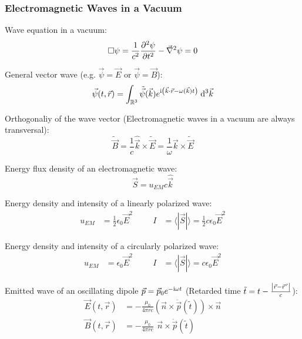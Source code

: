 		\subsubsection{Electromagnetic Waves in a Vacuum}
			\noindent
			Wave equation in a vacuum:
			\begin{equation}
				\Box\psi = \frac{1}{c^2} \frac{\partial^2 \psi}{\partial t^2} - \vec{\nabla}^2 \psi = 0
			\end{equation}

			\noindent
			General vector wave (e.g. $\vec{\psi}=\vec{E}$ or $ \vec{\psi}=\vec{B}$):
			\begin{equation}
				\vec{\psi}(t,\vec{r}) = \int_{\mathbb{R}^3} \tilde{\vec{\psi}} (\vec{k}) e^{\mathrm{i}\left(\vec{k}\cdot\vec{r} - \omega(\vec{k})t \right)}\; \mathrm{d}^3\vec{k}
			\end{equation}

			\noindent
			Orthogonaliy of the wave vector (Electromagnetic waves in a vacuum are always transversal):
			\begin{equation}
				\tilde{\vec{B}} = \frac{1}{c}\hat{\vec{k}}\times\tilde{\vec{E}} = \frac{1}{\omega}\vec{k}\times\tilde{\vec{E}}
			\end{equation}

			\noindent
			Energy flux density of an electromagnetic wave:
			\begin{equation}
				\vec{S} = u_{EM}c\hat{\vec{k}}
			\end{equation}

			\noindent
			Energy density and intensity of a linearly polarized wave:
			\begin{equation}
				\begin{aligned}
					u_{EM} &= \frac{1}{2}\epsilon_0\vec{E}^2 &\hspace{20pt}
					I &= \langle|\vec{S}|\rangle = \frac{1}{2}c\epsilon_0\vec{E}^2
				\end{aligned}
			\end{equation}

			\noindent
			Energy density and intensity of a circularly polarized wave:
			\begin{equation}
				\begin{aligned}
					u_{EM} &= \epsilon_0\vec{E}^2 &\hspace{20pt}
					I &= \langle|\vec{S}|\rangle = c\epsilon_0\vec{E}^2
				\end{aligned}
			\end{equation}

			\noindent
			Emitted wave of an oscillating dipole $\vec{p} = \vec{p}_0 e^{-\mathrm{i}\omega t}$ (Retarded time $\tilde{t} = t-\frac{\left|\vec{r}-\pvec{r}'\right|}{c}$):
			\begin{equation}
				\begin{aligned}
					\vec{E}(t,\vec{r}) &= -\frac{\mu_0}{4\pi r c}	\left(\vec{n}\times\ddot{\vec{p}}(\tilde{t})\right) \times \vec{n} \\
					\vec{B}(t,\vec{r}) &= -\frac{\mu_0}{4\pi r c} \phantom{\Big(}\vec{n}\times\ddot{\vec{p}}(\tilde{t}) \\
				\end{aligned}
			\end{equation}

